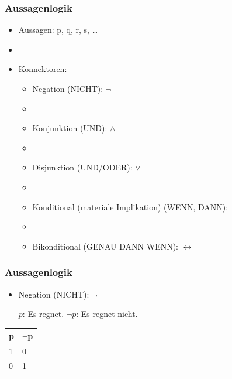 \begin{frame}
\end{frame}


\begin{frame}
\frametitle{Aussagenlogik}

\begin{itemize}
	\item Aussagen: p, q, r, s, \dots
	\item[]
	\item Konnektoren:
	
	\begin{itemize}
		\item Negation (NICHT): $\lnot$
		\item[]
		\item Konjunktion (UND): $\land$
		\item[]
		\item Disjunktion (UND/ODER): $\lor$
		\item[]
		\item Konditional (materiale Implikation) (WENN, DANN): \ras
		\item[]
		\item Bikonditional (GENAU DANN WENN): $\leftrightarrow$
	\end{itemize}
	
\end{itemize}

\end{frame}



\begin{frame}
\frametitle{Aussagenlogik}

\begin{itemize}
	\item Negation (NICHT): $\lnot$
	
	\eal
		\ex $p$: Es regnet.
		\ex $\lnot p$: Es regnet nicht.
	\zl
	
\end{itemize}

\begin{table}
\centering
\begin{tabular}{p{3cm}|p{3cm}}
\textbf{p} & \textbf{$\lnot$p}\\
\hline
1 & 0\\
\hline
0 & 1\\
\end{tabular}
\end{table}

\end{frame}


